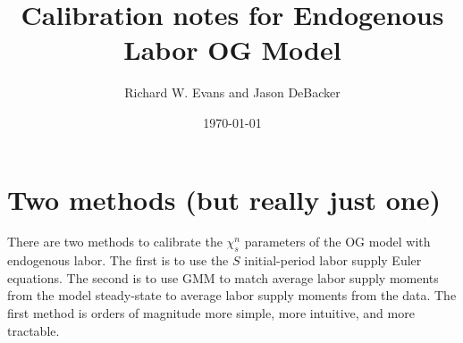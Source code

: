 \documentclass[letterpaper,12pt]{article}
\theoremstyle{definition}
\begin{document}
\title{Calibration notes for Endogenous Labor OG Model}
\date{\today}
\author{Richard W. Evans and Jason DeBacker}
\maketitle



\section{Two methods (but really just one)}

  There are two methods to calibrate the $\chi^n_s$ parameters of the OG model with endogenous labor. The first is to use the $S$ initial-period labor supply Euler equations. The second is to use GMM to match average labor supply moments from the model steady-state to average labor supply moments from the data. The first method is orders of magnitude more simple, more intuitive, and more tractable.



\end{document}
